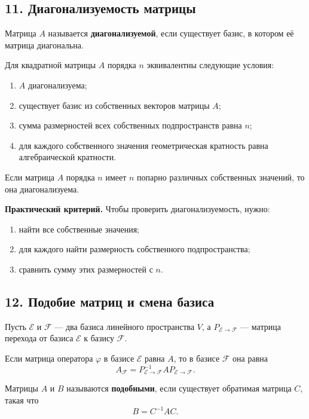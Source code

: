 \subsection*{11. Диагонализуемость матрицы}

Матрица $A$ называется \textbf{диагонализуемой}, если существует базис, в котором её матрица диагональна.

\begin{theorem}
Для квадратной матрицы $A$ порядка $n$ эквивалентны следующие условия:
\begin{enumerate}
    \item $A$ диагонализуема;
    \item существует базис из собственных векторов матрицы $A$;
    \item сумма размерностей всех собственных подпространств равна $n$;
    \item для каждого собственного значения геометрическая кратность равна алгебраической кратности.
\end{enumerate}
\end{theorem}

Если матрица $A$ порядка $n$ имеет $n$ попарно различных собственных значений, то она диагонализуема.

\noindent
\textbf{Практический критерий.}
Чтобы проверить диагонализуемость, нужно:
\begin{enumerate}
    \item найти все собственные значения;
    \item для каждого найти размерность собственного подпространства;
    \item сравнить сумму этих размерностей с $n$.
\end{enumerate}

\subsection*{12. Подобие матриц и смена базиса}

Пусть $\mathcal E$ и $\mathcal F$ --- два базиса линейного пространства $V$, а $P_{\mathcal E\to \mathcal F}$ --- матрица перехода от базиса $\mathcal E$ к базису $\mathcal F$.

Если матрица оператора $\varphi$ в базисе $\mathcal E$ равна $A$, то в базисе $\mathcal F$ она равна
\[
A_{\mathcal F}=P_{\mathcal E\to \mathcal F}^{-1} A P_{\mathcal E\to \mathcal F}.
\]

Матрицы $A$ и $B$ называются \textbf{подобными}, если существует обратимая матрица $C$, такая что
\[
B=C^{-1}AC.
\]

